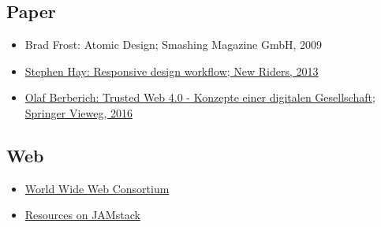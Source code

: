 \subsection*{Paper\label{/mi-2017/modulbeschreibungen-master/MA_WTW_Modul_Web-Technologien}}\label{paperpathlabelmi-2017modulbeschreibungen-mastermaux5fwtwux5fmodulux5fweb-technologien}

\begin{itemize}
\tightlist
\item
  Brad Frost: Atomic Design; Smashing Magazine GmbH, 2009
\item
  \href{http://www.digibib.net/permalink/832/FHBK-x/HBZ:HT017780178}{Stephen
  Hay: Responsive design workflow; New Riders, 2013}
\item
  \href{http://www.digibib.net/permalink/832/FHBK-x/HBZ:HT019048164}{Olaf
  Berberich: Trusted Web 4.0 - Konzepte einer digitalen Gesellschaft;
  Springer Vieweg, 2016}
\end{itemize}

\subsection*{Web\label{/mi-2017/modulbeschreibungen-master/MA_WTW_Modul_Web-Technologien}}\label{webpathlabelmi-2017modulbeschreibungen-mastermaux5fwtwux5fmodulux5fweb-technologien}

\begin{itemize}
\tightlist
\item
  \href{https://www.w3.org/}{World Wide Web Consortium}
\item
  \href{https://jamstack.org/resources/}{Resources on JAMstack}
\end{itemize}
